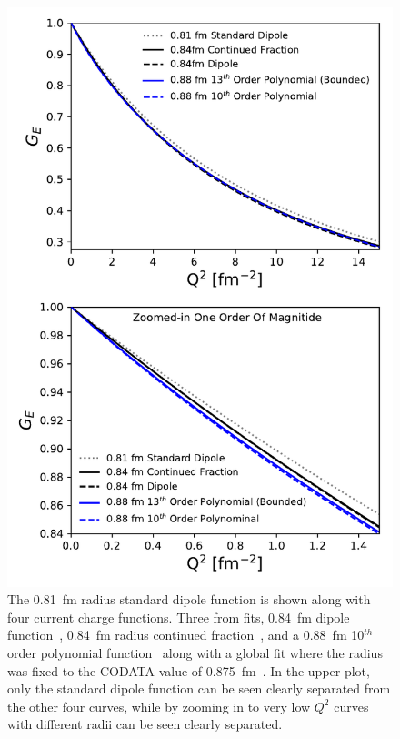 \documentclass[10pt,superscriptaddress,aps,prc,twocolumn]{revtex4-1}
\begin{document}
\begin{figure}
\includegraphics[width=\columnwidth]{Figure/TwoOrders.pdf}
\caption{The 0.81~fm radius standard dipole function is shown along with four current charge functions.
Three from fits, 0.84~fm dipole function~\cite{Higinbotham:2015rja}, 0.84~fm radius continued fraction~\cite{Griffioen:2015hta},
and a 0.88~fm 10$^{th}$ order polynomial function~\cite{Bernauer:2010wm} along with a global fit where the radius was fixed
to the CODATA value of 0.875~fm~\cite{Ye:2017gyb}.   In the upper plot, only the standard dipole function can be seen clearly
separated from the other four curves, while by zooming in to very low $Q^2$ curves with different radii can be seen clearly
separated.}
\label{TwoOrders}
\end{figure}
\end{document}
